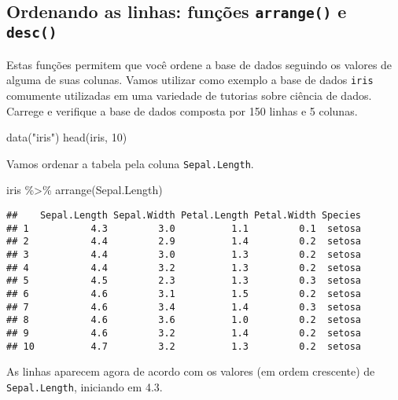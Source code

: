 \documentclass[
]{book}
\newenvironment{Shaded}{\begin{snugshade}}{\end{snugshade}}
\newcommand{\DecValTok}[1]{\textcolor[rgb]{0.00,0.00,0.81}{#1}}
\newcommand{\FunctionTok}[1]{\textcolor[rgb]{0.00,0.00,0.00}{#1}}
\newcommand{\NormalTok}[1]{#1}
\newcommand{\SpecialCharTok}[1]{\textcolor[rgb]{0.00,0.00,0.00}{#1}}
\newcommand{\StringTok}[1]{\textcolor[rgb]{0.31,0.60,0.02}{#1}}
\begin{document}
\hypertarget{ordenando-as-linhas-funuxe7uxf5es-arrange-e-desc}{%
\subsection{\texorpdfstring{Ordenando as linhas: funções \texttt{arrange()} e \texttt{desc()}}{Ordenando as linhas: funções arrange() e desc()}}\label{ordenando-as-linhas-funuxe7uxf5es-arrange-e-desc}}

Estas funções permitem que você ordene a base de dados seguindo os valores de alguma de suas colunas. Vamos utilizar como exemplo a base de dados \texttt{iris} comumente utilizadas em uma variedade de tutorias sobre ciência de dados. Carrege e verifique a base de dados composta por 150 linhas e 5 colunas.

\begin{Shaded}
\begin{Highlighting}[]
\FunctionTok{data}\NormalTok{(}\StringTok{"iris"}\NormalTok{)}
\FunctionTok{head}\NormalTok{(iris, }\DecValTok{10}\NormalTok{)}
\end{Highlighting}
\end{Shaded}

Vamos ordenar a tabela pela coluna \texttt{Sepal.Length}.

\begin{Shaded}
\begin{Highlighting}[]
\NormalTok{iris }\SpecialCharTok{\%\textgreater{}\%} 
  \FunctionTok{arrange}\NormalTok{(Sepal.Length)}
\end{Highlighting}
\end{Shaded}

\begin{verbatim}
##    Sepal.Length Sepal.Width Petal.Length Petal.Width Species
## 1           4.3         3.0          1.1         0.1  setosa
## 2           4.4         2.9          1.4         0.2  setosa
## 3           4.4         3.0          1.3         0.2  setosa
## 4           4.4         3.2          1.3         0.2  setosa
## 5           4.5         2.3          1.3         0.3  setosa
## 6           4.6         3.1          1.5         0.2  setosa
## 7           4.6         3.4          1.4         0.3  setosa
## 8           4.6         3.6          1.0         0.2  setosa
## 9           4.6         3.2          1.4         0.2  setosa
## 10          4.7         3.2          1.3         0.2  setosa
\end{verbatim}

As linhas aparecem agora de acordo com os valores (em ordem crescente) de \texttt{Sepal.Length}, iniciando em 4.3.
\end{document}
